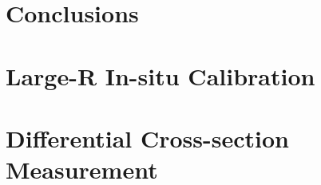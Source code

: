 \newpage
\chapter{Conclusions}
\label{sec:conclusion}

\FloatBarrier


%
%
\printbibliography[title={References},heading=bibintoc] %

\begin{uomappendix} 
\chapter{Large-R \zjets In-situ Calibration}

\chapter{Differential Cross-section Measurement}

\end{uomappendix}



